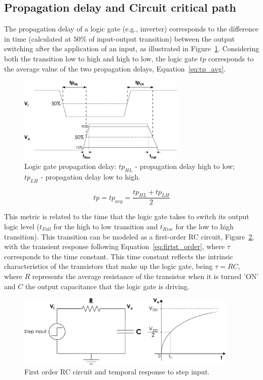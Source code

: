 \subsection{Propagation delay and Circuit critical path}

The propagation delay of a logic gate (e.g., inverter) corresponds to the difference in time (calculated at $50\%$ of input-output transition) between the output switching after the application of an input, as illustrated in Figure~\ref{fig:tp}. Considering both the transition low to high and high to low, the logic gate $tp$ corresponds to the average value of the two propagation delays, Equation~\ref{eq:tp_avg}.

\begin{figure}[htb]
    \centering
    \includegraphics[width=80mm]{Figures/Background/propagation_delay.pdf}
    \caption{Logic gate propagation delay: $tp_{HL}$ - propagation delay high to low; $tp_{LH}$ - propagation delay low to high.}
    \label{fig:tp}
\end{figure}

\begin{equation}
    tp = tp_{avg} = \frac{tp_{HL}+tp_{LH}}{2}
    \label{eq:tp_avg}
\end{equation}

This metric is related to the time that the logic gate takes to switch its output logic level ($t_{Fall}$ for the high to low transition and $t_{Rise}$ for the low to high transition). This transition can be modeled as a first-order RC circuit, Figure~\ref{fig:rc_circuit}, with the transient response following Equation~\ref{eq:firtst_order}, where $\tau$ corresponds to the time constant. This time constant reflects the intrinsic characteristics of the transistors that make up the logic gate, being $\tau=RC$, where $R$ represents the average resistance of the transistor when it is turned 'ON' and $C$ the output capacitance that the logic gate is driving.


\begin{figure}[htb]
    \centering
    \includegraphics[width=105mm]{Figures/Background/rc_circuit.pdf}
    \caption{First order RC circuit and temporal response to step input.}
    \label{fig:rc_circuit}
\end{figure}

